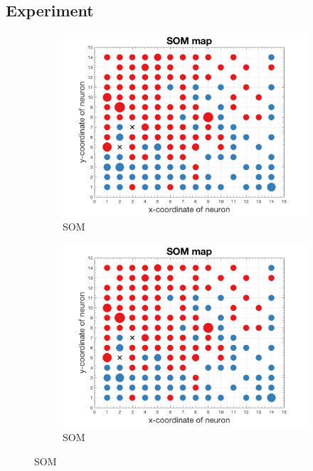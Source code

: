 \documentclass[thesis=M,czech]{FITthesis}[2012/06/26]
\begin{document}
\subsection{Experiment}\label{exp:70-vs-10}


\begin{figure}
\centering

\begin{subfigure}{.5\textwidth}
  \centering
  \includegraphics[width=1\linewidth]{exp_sexp_off_som.png}
  \caption{SOM}
  \label{fig:sub1}
\end{subfigure}%
\begin{subfigure}{.5\textwidth}
  \centering
  \includegraphics[width=1\linewidth]{exp_sexp_off_som.png}
  \caption{SOM}
  \label{fig:sub1}
\end{subfigure}%




\end{figure}
\end{document}
